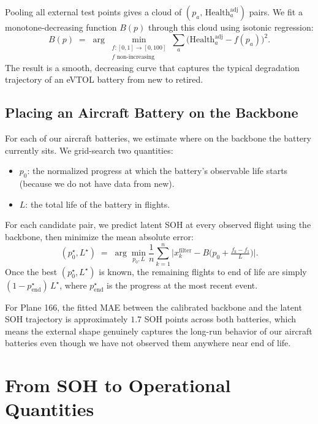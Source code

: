 \documentclass[11pt]{article}
\begin{document}
Pooling all external test points gives a cloud of
\((p_a,\, \mathrm{Health}^{\mathrm{adj}}_a)\) pairs. We fit a
monotone-decreasing function \(B(p)\) through this cloud using isotonic
regression:
\begin{equation}
B(p) \;=\; \arg\min_{\substack{f:[0,1]\to[0,100] \\ f\text{ non-increasing}}}
\sum_{a}\big(\mathrm{Health}^{\mathrm{adj}}_a - f(p_a)\big)^{2}.
\label{eq:isotonic}
\end{equation}
The result is a smooth, decreasing curve that captures the typical
degradation trajectory of an eVTOL battery from new to retired.

\subsection{Placing an Aircraft Battery on the Backbone}

For each of our aircraft batteries, we estimate where on the backbone
the battery currently sits. We grid-search two quantities:
\begin{itemize}[leftmargin=*]
    \item \(p_0\): the normalized progress at which the battery's
    observable life starts (because we do not have data from new).
    \item \(L\): the total life of the battery in flights.
\end{itemize}
For each candidate pair, we predict latent SOH at every observed
flight using the backbone, then minimize the mean absolute error:
\begin{equation}
(p_0^{\star}, L^{\star}) \;=\;
\arg\min_{p_0, L} \frac{1}{n}\sum_{k=1}^{n}\bigg|x^{\mathrm{filter}}_k - B\!\Big(p_0 + \tfrac{f_k - f_1}{L}\Big)\bigg|.
\label{eq:plane_calibration}
\end{equation}
Once the best \((p_0^{\star}, L^{\star})\) is known, the remaining
flights to end of life are simply \((1 - p^{\star}_{\mathrm{end}})\,L^{\star}\),
where \(p^{\star}_{\mathrm{end}}\) is the progress at the most recent
event.

For Plane 166, the fitted MAE between the calibrated backbone and the
latent SOH trajectory is approximately \(1.7\) SOH points across both
batteries, which means the external shape genuinely captures the
long-run behavior of our aircraft batteries even though we have not
observed them anywhere near end of life.

\section{From SOH to Operational Quantities}
\end{document}
